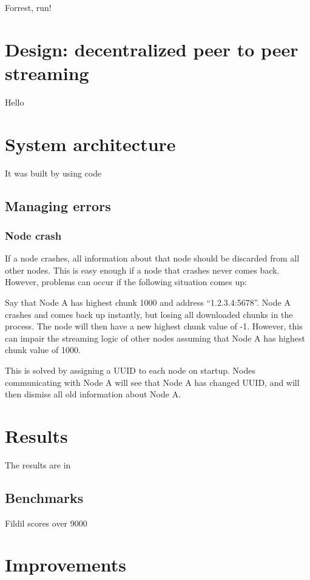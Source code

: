 \documentclass[10pt, a4paper]{article}
\begin{document}
Forrest, run!

\section{Design: decentralized peer to peer streaming}

Hello

\section{System architecture}

It was built by using code

\subsection{Managing errors}

\subsubsection{Node crash}
If a node crashes, all information about that node should be discarded from all
other nodes. This is easy enough if a node that crashes never comes
back. However, problems can occur if the following situation comes up:

Say that Node A has highest chunk 1000 and address ``1.2.3.4:5678''. Node A
crashes and comes back up instantly, but losing all downloaded chunks in the
process. The node will then have a new highest chunk value of -1. However, this
can impair the streaming logic of other nodes assuming that Node A has highest
chunk value of 1000.

This is solved by assigning a UUID to each node on startup. Nodes communicating
with Node A will see that Node A has changed UUID, and will then dismiss all old
information about Node A.

\section{Results}

The results are in

\subsection{Benchmarks}

Fildil scores over 9000

\section{Improvements}
\end{document}
